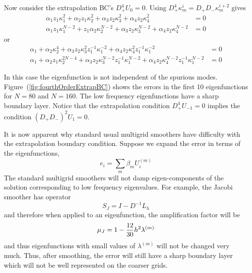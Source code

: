 Now consider the extrapolation BC's $D_+^4 U_0=0$. Using $D_+^4\kappa_m^i = D_+D_-\kappa_m^{i+2}$ gives
\begin{align}
  \alpha_1 z_1 \kappa_1^2 + \alpha_2 z_1 \kappa_2^2
                    + \alpha_3 z_2\kappa_3^{2} + \alpha_4 z_2\kappa_4^{2} &= 0  \label{eq:eiv3}\\
  \alpha_1 z_1\kappa_1^{N-2} + z_1\alpha_2\kappa_2^{N-2} 
                    + \alpha_3 z_2\kappa_3^{N-2} + \alpha_4 z_2\kappa_4^{N-2} &= 0 \label{eq:eiv4}
\end{align}
or
\begin{align}
  \alpha_1  + \alpha_2 \kappa_2^4 + \alpha_3 z_2\kappa_3^{2}z_1^{-1}\kappa_1^{-2}
                 + \alpha_4 z_2\kappa_4^{2}z_1^{-1}\kappa_1^{-2} &= 0  \label{eq:eiv3}\\
  \alpha_1  + \alpha_2 z_1\kappa_2^{2N-4} 
                 + \alpha_3 z_2\kappa_3^{N-2}z_1^{-1}\kappa_1^{N-2} 
                 + \alpha_4 z_2\kappa_4^{N-2}z_1^{-1}\kappa_1^{N-2}  &= 0 \label{eq:eiv4}
\end{align}

In this case the eigenfunction is not independent of the spurious modes. Figure~(\ref{fig:fourthOrderExtrapBC}) shows 
the errors in the first 10 eigenfunctions for $N=80$ and $N=160$. The low frequency eigenfunctions have a
sharp boundary layer. 
Notice that the extrapolation condition $D_+^4 U_{-1} =0$ implies the condition $(D_+D_-)^2 U_1=0$. 


 It is now apparent why standard usual multigrid  smoothers
have difficulty with the extrapolation boundary condition. Suppose we expand the error in terms of the eigenfunctions,
\[
      e_i = \sum_m \beta_m U^{(m)}_i 
\]
The standard multigrid smoothers will not damp eigen-components
of the solution corresponding to low frequency eigenvalues. For example, the Jacobi smoother has operator
\[
       S_J =  I - D^{-1} L_h
\]
and therefore when applied to an eigenfunction, the amplification factor will be
\[
       \mu_J =  1 - {12\over30} h^2 \lambda^{(m)}
\]
and thus eigenfunctions with small values of $\lambda^{(m)}$ will not be changed very much.
Thus, after smoothing, the error will still have
a sharp boundary layer which will not be well represented on the coarser grids.


